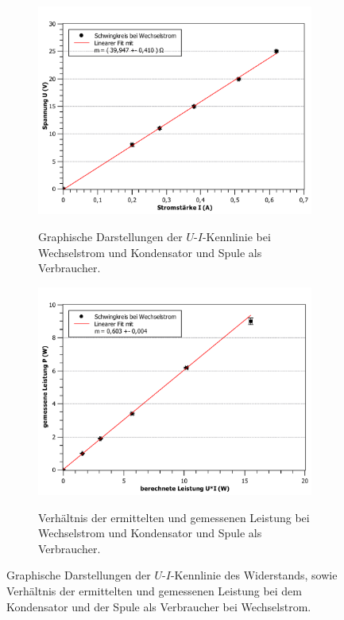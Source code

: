 \begin{figure}[ht]
	\centering	
	\begin{subfigure}{0.70\textwidth}
		\centering
		\includegraphics[width=\textwidth]{auswertung/kondensator-wechsel-Widerstand.pdf}
		\label{fig:9}
		\caption{Graphische Darstellungen der $U$-$I$-Kennlinie bei Wechselstrom und Kondensator und Spule als Verbraucher.}	
	\end{subfigure}
	\begin{subfigure}{0.70\textwidth}
		\centering
		\includegraphics[width=\textwidth]{auswertung/kondensator-wechsel-Leistung.pdf}
		\label{fig:10}
		\caption{Verhältnis der ermittelten und gemessenen Leistung bei Wechselstrom und Kondensator und Spule als Verbraucher.}	
	\end{subfigure}
	\caption{Graphische Darstellungen der $U$-$I$-Kennlinie des Widerstands, sowie Verhältnis der ermittelten und gemessenen Leistung bei dem Kondensator und der Spule als Verbraucher bei Wechselstrom.}
\end{figure}

